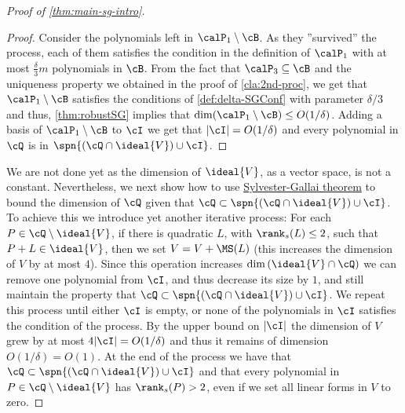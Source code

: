\begin{proof}[Proof of \autoref{thm:main-sg-intro}]
\begin{proof}
Consider the polynomials left in $\calP_1\setminus \cB$. As they ''survived'' the process, each of them satisfies the condition in the definition of $\calP_1$  with at most $\frac{\delta}{3}m$ polynomials in $\cB$. From the fact that $\calP_3\subseteq \cB$ and  the uniqueness property we obtained in the proof of \autoref{cla:2nd-proc}, we get that $\calP_1\setminus \cB$ satisfies the conditions of \autoref{def:delta-SGConf} with parameter $\delta/3$ and thus, \autoref{thm:robustSG} implies that $\dim(\calP_1\setminus \cB)\leq O(1/\delta)$. Adding a basis of $\calP_1\setminus \cB$ to $\cI$ we get that $|\cI| = O(1/\delta)$ and every polynomial in $\cQ$ is in $\spn{(\cQ\cap \ideal{V})\cup \cI}$.
\end{proof}


 
We are not done yet as the dimension of $\ideal{V}$, as a vector space, is not a constant.  Nevertheless, we next show how to use \hyperref[thm:SG-linforms]{Sylvester-Gallai theorem} to bound the dimension of $\cQ$ given that  $\cQ \subset \spn{(\cQ\cap \ideal{V})\cup \cI}$. To achieve this we introduce yet another iterative process:  For each $P\in \cQ\setminus \ideal{V}$, if there is quadratic $L$, with $\rank_s(L) \leq 2$, such that  $P + L \in \ideal{V}$, then we set $V = V+\MS(L)$ (this increases the dimension of $V$ by at most $4$). Since this operation increases $\dim\left( \ideal{V}\cap \cQ \right)$ we can remove one polynomial from $\cI$, and thus decrease its size by $1$, and still maintain the property that $\cQ \subset \spn{(\cQ\cap \ideal{V})\cup \cI}$. We repeat this process until either $\cI$ is empty, or none of the polynomials in $\cI$ satisfies the condition of the process. By the upper bound on $|\cI|$ the dimension of $V$ grew by at most  $4|\cI|= O( 1/{\delta})$ and thus it remains of dimension $O( 1/{\delta})=O(1)$. 
At the end of the process we have that $\cQ \subset \spn{(\cQ\cap \ideal{V})\cup \cI}$
and that every polynomial in $P \in \cQ\setminus \ideal{V}$ has $\rank_s(P) > 2$, even if we set all linear forms in $V$ to zero. 


\end{proof}
